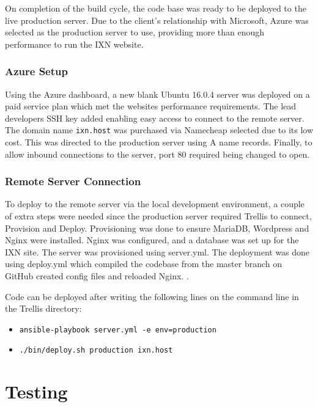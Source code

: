 \documentclass[fontsize=11pt]{extarticle}
\numberwithin{figure}{section} %
\numberwithin{table}{section}%
\providecommand{\tightlist}{%
  \setlength{\itemsep}{0pt}\setlength{\parskip}{0pt}}
\begin{document}
On completion of the build cycle, the code base was ready to be deployed
to the live production server. Due to the client's relationship with
Microsoft, Azure was selected as the production server to use, providing
more than enough performance to run the IXN website.

\hypertarget{azure-setup}{%
\subsubsection{Azure Setup}\label{azure-setup}}

Using the Azure dashboard, a new blank Ubuntu 16.0.4 server was deployed
on a paid service plan which met the websites performance requirements.
The lead developers SSH key added enabling easy access to connect to the
remote server. The domain name \texttt{ixn.host} was purchased via
Namecheap selected due to its low cost. This was directed to the
production server using A name records. Finally, to allow inbound
connections to the server, port 80 required being changed to open.

\hypertarget{remote-server-connection}{%
\subsubsection{Remote Server
Connection}\label{remote-server-connection}}

To deploy to the remote server via the local development environment, a
couple of extra steps were needed since the production server required
Trellis to connect, Provision and Deploy. Provisioning was done to
ensure MariaDB, Wordpress and Nginx were installed. Nginx was
configured, and a database was set up for the IXN site. The server was
provisioned using server.yml. The deployment was done using deploy.yml
which compiled the codebase from the master branch on GitHub created
config files and reloaded Nginx. \cite{p23}.

Code can be deployed after writing the following lines on the command
line in the Trellis directory:

\begin{itemize}
\tightlist
\item
  \texttt{ansible-playbook\ server.yml\ -e\ env=production}
\item
  \texttt{./bin/deploy.sh\ production\ ixn.host}
\end{itemize}

\newpage

\hypertarget{testing}{%
\section{Testing}\label{testing}}
\end{document}
